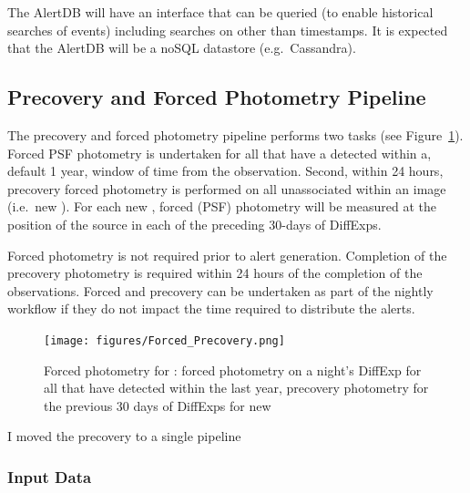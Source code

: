 The AlertDB will have an interface that can be queried (to enable historical searches of events) including searches on other than timestamps. It is expected that the AlertDB will be a noSQL datastore (e.g.\ Cassandra).






\clearpage

\subsection{Precovery and Forced Photometry Pipeline}

The precovery and forced photometry  pipeline performs two tasks (see Figure~\ref{fig:apForcedPrecovery}). Forced PSF photometry is undertaken for all \DIAObjects that have a detected \DIASource within a, default 1 year, window of time from the observation.  Second, within 24 hours, precovery forced photometry is performed on all unassociated \DIASources within an image (i.e.\ new \DIAObjects). For each new \DIAObject, forced (PSF) photometry will be measured at the position of the source in each of the preceding  30-days of DiffExps.

Forced photometry is not required prior to alert generation. Completion of the precovery photometry is required within 24 hours of the completion of the observations. Forced and precovery can be undertaken as part of the nightly workflow if they do not impact the time required to distribute the alerts.

\begin{figure}[th]
\begin{center}
\texttt{[image: figures/Forced\_Precovery.png]}
\caption{\label{fig:apForcedPrecovery} Forced photometry for \DIAObjects: forced photometry on a night's DiffExp for all \DIAObjects that have detected \DIASources within the last year, precovery photometry for the previous 30 days of DiffExps for new \DIAObjects}
\end{center}
\end{figure}

\begin{draftnote}[For ZI]
  I moved the precovery to a single pipeline
\end{draftnote}
\subsubsection{Input Data}


